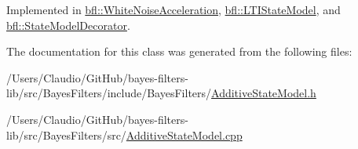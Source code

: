 Implemented in \mbox{\hyperlink{classbfl_1_1WhiteNoiseAcceleration_a0203b47074e0680852f53dcba8a7a627}{bfl\+::\+White\+Noise\+Acceleration}}, \mbox{\hyperlink{classbfl_1_1LTIStateModel_afc2264780111fe41b6a82e97bcb5e87c}{bfl\+::\+L\+T\+I\+State\+Model}}, and \mbox{\hyperlink{classbfl_1_1StateModelDecorator_ad292f3b665c1adf20a1f32dc8a065fec}{bfl\+::\+State\+Model\+Decorator}}.



The documentation for this class was generated from the following files\+:\begin{DoxyCompactItemize}
\item 
/\+Users/\+Claudio/\+Git\+Hub/bayes-\/filters-\/lib/src/\+Bayes\+Filters/include/\+Bayes\+Filters/\mbox{\hyperlink{AdditiveStateModel_8h}{Additive\+State\+Model.\+h}}\item 
/\+Users/\+Claudio/\+Git\+Hub/bayes-\/filters-\/lib/src/\+Bayes\+Filters/src/\mbox{\hyperlink{AdditiveStateModel_8cpp}{Additive\+State\+Model.\+cpp}}\end{DoxyCompactItemize}
